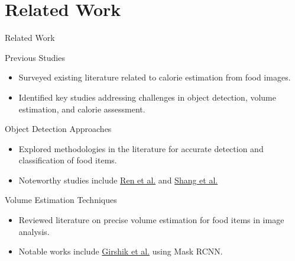 \documentclass{beamer}
\begin{document}
	\section{Related Work}
	\begin{frame}{Related Work}
		\begin{block}{Previous Studies}\scriptsize
			\begin{itemize}
				\item Surveyed existing literature related to calorie estimation from food images.
				\item Identified key studies addressing challenges in object detection, volume estimation, and calorie assessment.
			\end{itemize}
		\end{block}
		\begin{block}{Object Detection Approaches}\scriptsize
			\begin{itemize}
				\item Explored methodologies in the literature for accurate detection and classification of food items.
				\item Noteworthy studies include \href{https://proceedings.neurips.cc/paper_files/paper/2015/file/14bfa6bb14875e45bba028a21ed38046-Paper.pdf}{Ren et al.} and \href{https://ieeexplore.ieee.org/stamp/stamp.jsp?arnumber=8978787}{Shang et al.}
			\end{itemize}
		\end{block}
		\begin{block}{Volume Estimation Techniques}\scriptsize
				\begin{itemize}
				\item Reviewed literature on precise volume estimation for food items in image analysis.
				\item Notable works include \href{https://arxiv.org/abs/1703.06870}{Girshik et al.} using Mask RCNN.
			\end{itemize}
		\end{block}
	\end{frame}
	
\end{document}
